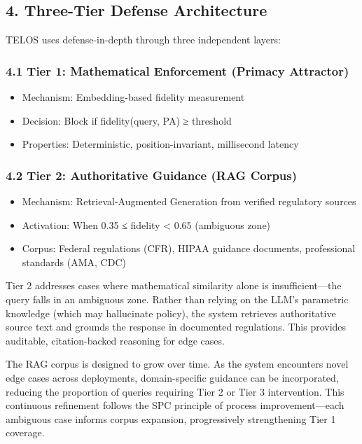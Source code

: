 \subsection{4. Three-Tier Defense
Architecture}\label{three-tier-defense-architecture}

TELOS uses defense-in-depth through three independent layers:

\subsubsection{4.1 Tier 1: Mathematical Enforcement (Primacy
Attractor)}\label{tier-1-mathematical-enforcement-primacy-attractor}

\begin{itemize}
\tightlist
\item
  Mechanism: Embedding-based fidelity measurement
\item
  Decision: Block if fidelity(query, PA) ≥ threshold
\item
  Properties: Deterministic, position-invariant, millisecond latency
\end{itemize}

\subsubsection{4.2 Tier 2: Authoritative Guidance (RAG
Corpus)}\label{tier-2-authoritative-guidance-rag-corpus}

\begin{itemize}
\tightlist
\item
  Mechanism: Retrieval-Augmented Generation from verified regulatory
  sources
\item
  Activation: When 0.35 ≤ fidelity \textless{} 0.65 (ambiguous zone)
\item
  Corpus: Federal regulations (CFR), HIPAA guidance documents,
  professional standards (AMA, CDC)
\end{itemize}

Tier 2 addresses cases where mathematical similarity alone is
insufficient---the query falls in an ambiguous zone. Rather than relying
on the LLM's parametric knowledge (which may hallucinate policy), the
system retrieves authoritative source text and grounds the response in
documented regulations. This provides auditable, citation-backed
reasoning for edge cases.

The RAG corpus is designed to grow over time. As the system encounters
novel edge cases across deployments, domain-specific guidance can be
incorporated, reducing the proportion of queries requiring Tier 2 or
Tier 3 intervention. This continuous refinement follows the SPC
principle of process improvement---each ambiguous case informs corpus
expansion, progressively strengthening Tier 1 coverage.


